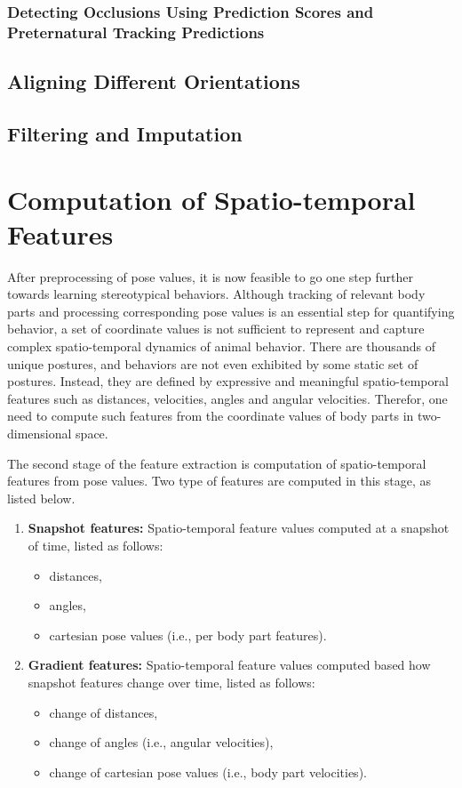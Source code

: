 \subsubsection{Detecting Occlusions Using Prediction Scores and Preternatural Tracking Predictions}

\subsection{Aligning Different Orientations}

\subsection{Filtering and Imputation}

\section{Computation of Spatio-temporal Features}
After preprocessing of pose values, it is now feasible to go one step further towards learning stereotypical behaviors.
Although tracking of relevant body parts and processing corresponding pose values is an essential step for quantifying behavior, a set of coordinate values is not sufficient to represent and capture complex spatio-temporal dynamics of animal behavior.
There are thousands of unique postures, and behaviors are not even exhibited by some static set of postures.
Instead, they are defined by expressive and meaningful spatio-temporal features such as distances, velocities, angles and angular velocities.
Therefor, one need to compute such features from the coordinate values of body parts in two-dimensional space.

The second stage of the feature extraction is computation of spatio-temporal features from pose values. Two type of features are computed in this stage, as listed below.
\begin{enumerate}
	\item \textbf{Snapshot features:} Spatio-temporal feature values computed at a snapshot of time, listed as follows:
	      \begin{itemize}
		      \item distances,
		      \item angles,
		      \item cartesian pose values (i.e., per body part features).
	      \end{itemize}
	\item \textbf{Gradient features:} Spatio-temporal feature values computed based how snapshot features change over time, listed as follows:
	      \begin{itemize}
		      \item change of distances,
		      \item change of angles (i.e., angular velocities),
		      \item change of cartesian pose values (i.e., body part velocities).
	      \end{itemize}
\end{enumerate}

